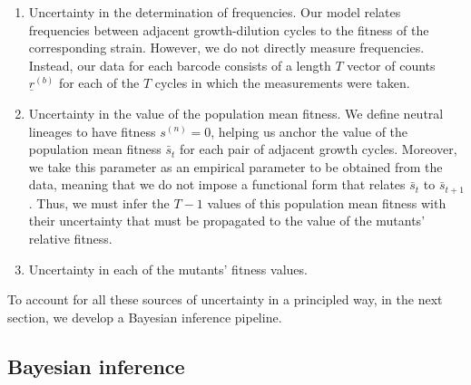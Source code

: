 \documentclass[
]{scrartcl}
\providecommand{\tightlist}{%
  \setlength{\itemsep}{0pt}\setlength{\parskip}{0pt}}\usepackage{longtable,booktabs,array}
\begin{document}
\begin{refsegment}
\begin{enumerate}
\def\labelenumi{\arabic{enumi}.}
\tightlist
\item
  Uncertainty in the determination of frequencies. Our model relates
  frequencies between adjacent growth-dilution cycles to the fitness of
  the corresponding strain. However, we do not directly measure
  frequencies. Instead, our data for each barcode consists of a length
  \(T\) vector of counts \(\underline{r}^{(b)}\) for each of the \(T\)
  cycles in which the measurements were taken.
\item
  Uncertainty in the value of the population mean fitness. We define
  neutral lineages to have fitness \(s^{(n)} = 0\), helping us anchor
  the value of the population mean fitness \(\bar{s}_t\) for each pair
  of adjacent growth cycles. Moreover, we take this parameter as an
  empirical parameter to be obtained from the data, meaning that we do
  not impose a functional form that relates \(\bar{s}_t\) to
  \(\bar{s}_{t+1}\). Thus, we must infer the \(T-1\) values of this
  population mean fitness with their uncertainty that must be propagated
  to the value of the mutants' relative fitness.
\item
  Uncertainty in each of the mutants' fitness values.
\end{enumerate}

To account for all these sources of uncertainty in a principled way, in
the next section, we develop a Bayesian inference pipeline.

\hypertarget{sec-bayesian_inference}{%
\subsection{Bayesian inference}\label{sec-bayesian_inference}}


\end{refsegment}
\end{document}
